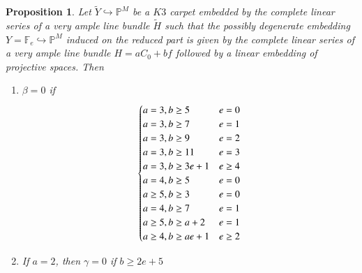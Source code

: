 \documentclass[11pt,twoside]{amsart}
\theoremstyle{plain}
\numberwithin{equation}{section}
\newtheorem{proposition}[theorem]{Proposition}
\theoremstyle{definition}
\begin{document}
\begin{proposition}\label{calculating beta}
Let $\widetilde{Y} \hookrightarrow \mathbb{P}^M$ be a $K3$ carpet embedded by the complete linear series of a very ample line bundle $\widetilde{H}$ such that the possibly degenerate embedding $Y = \mathbb{F}_e \hookrightarrow \mathbb{P}^M$ induced on the reduced part is given by the complete linear series of a very ample line bundle $H = aC_0+bf$ followed by a linear embedding of projective spaces.   
Then 

\begin{enumerate}
    \item $\beta = 0$ if
    \[
\begin{cases}
    a = 3, b \geq 5 & e = 0  \\
    a = 3, b \geq 7 & e = 1  \\
    a = 3, b \geq 9 & e = 2  \\
\color{black}
    a = 3, b \geq 11 &  \textcolor{black}{e = 3} \\
    a = 3, b \geq 3e+1 & e \geq 4 \\
\color{black}
    a = 4, b \geq 5 & e = 0 \\
    a \geq 5, b \geq 3 & e = 0 \\
    \textcolor{black}{a = 4, b \geq 7} & \textcolor{black}{e = 1} \\
   \textcolor{black}{a \geq 5}, b \geq a+2 & e = 1 \\
    a \geq 4, b \geq ae+1 & e \geq 2 \\
    
\end{cases}
  \]

  \item If $a = 2$, then $\gamma = 0$ if $b \geq 2e+5$



\end{enumerate}
  

 


\end{proposition}
 
\end{document}
